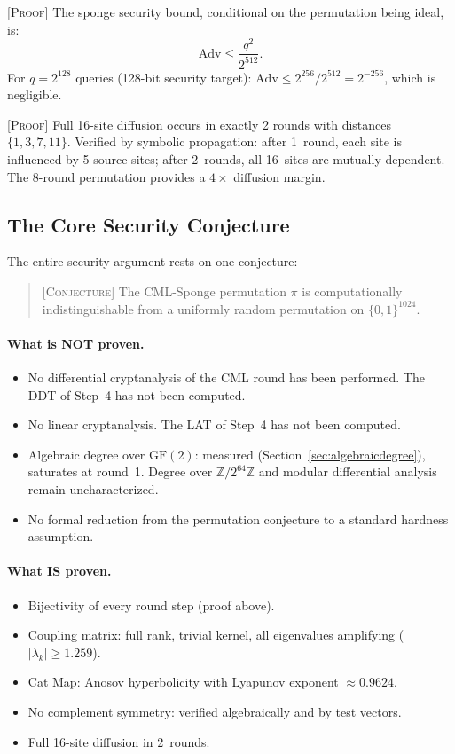 \documentclass[runningheads]{llncs}
\newcommand{\proof}[1]{\textsc{[Proof]} #1}
\newcommand{\conjecture}[1]{\textsc{[Conjecture]} #1}
\newcommand{\Ztwo}{\mathbb{Z}/2^{64}\mathbb{Z}}
\begin{document}
\proof{The sponge security bound, conditional on the permutation being ideal, is:
\[
  \mathrm{Adv} \leq \frac{q^2}{2^{512}}.
\]
For $q = 2^{128}$ queries (128-bit security target):
$\mathrm{Adv} \leq 2^{256}/2^{512} = 2^{-256}$, which is negligible.}

\proof{Full 16-site diffusion occurs in exactly 2 rounds with distances $\{1,3,7,11\}$.
Verified by symbolic propagation: after 1~round, each site is influenced by
5 source sites; after 2~rounds, all 16~sites are mutually dependent.
The 8-round permutation provides a $4\times$ diffusion margin.}

\subsection{The Core Security Conjecture}

The entire security argument rests on one conjecture:

\begin{quote}
\conjecture{The CML-Sponge permutation $\pi$ is computationally indistinguishable
from a uniformly random permutation on $\{0,1\}^{1024}$.}
\end{quote}

\paragraph{What is NOT proven.}
\begin{itemize}[nosep]
\item No differential cryptanalysis of the CML round has been performed.
  The DDT of Step~4 has not been computed.
\item No linear cryptanalysis.  The LAT of Step~4 has not been computed.
\item Algebraic degree over $\mathrm{GF}(2)$: measured (Section~\ref{sec:algebraicdegree}),
  saturates at round~1.  Degree over $\Ztwo$ and modular differential analysis
  remain uncharacterized.
\item No formal reduction from the permutation conjecture to a standard
  hardness assumption.
\end{itemize}

\paragraph{What IS proven.}
\begin{itemize}[nosep]
\item Bijectivity of every round step (proof above).
\item Coupling matrix: full rank, trivial kernel, all eigenvalues amplifying
  ($|\lambda_k| \geq 1.259$).
\item Cat Map: Anosov hyperbolicity with Lyapunov exponent $\approx 0.9624$.
\item No complement symmetry: verified algebraically and by test vectors.
\item Full 16-site diffusion in 2~rounds.
\end{itemize}
\end{document}
